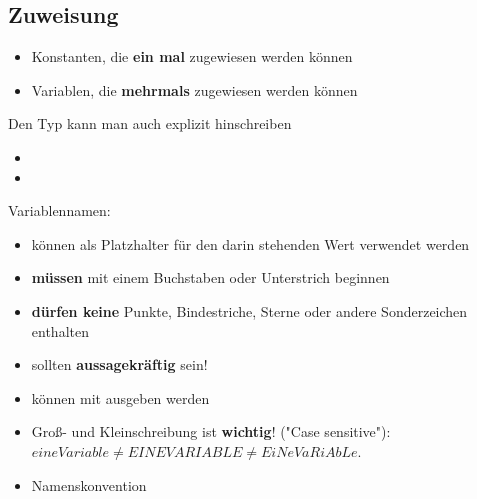 \subsection{Zuweisung}
\begin{frame}
    \slidehead
    \begin{itemize}[<+->]
        \item Konstanten, die \textbf{ein mal} zugewiesen werden können\\
            \vspace{1em}
        \item Variablen, die \textbf{mehrmals} zugewiesen werden können\\
    \end{itemize}
    \onslide<+->
\end{frame}

\begin{frame}
    \slidehead
    Den Typ kann man auch explizit hinschreiben
    \vspace{1em}
    \begin{itemize}
        \item {}
            \vspace{1em}
        \item {}
    \end{itemize}
    \pause
\end{frame}

\begin{frame}
    \slidehead

    Variablennamen:
    \begin{itemize}[<+->]
        \item können als Platzhalter für den darin stehenden Wert verwendet werden
        \item \textbf{müssen} mit einem Buchstaben oder Unterstrich beginnen
        \item \textbf{dürfen keine} Punkte, Bindestriche, Sterne oder andere Sonderzeichen enthalten
        \item sollten \textbf{aussagekräftig} sein!
        \item können mit  ausgeben werden
        \item Groß- und Kleinschreibung ist \textbf{wichtig}! ("Case sensitive"):\\ $eineVariable \neq EINEVARIABLE \neq EiNeVaRiAbLe$.
        \item Namenskonvention 
    \end{itemize}
\end{frame}

